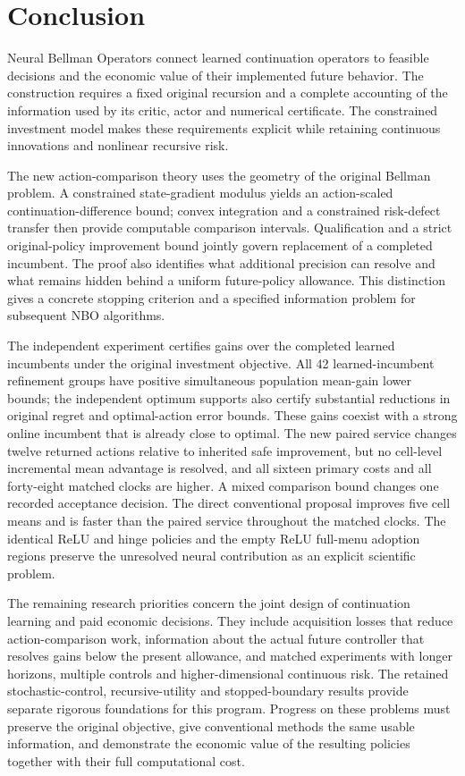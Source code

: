 \section{Conclusion}\label{sec:conclusion120}
Neural Bellman Operators connect learned continuation operators to feasible
decisions and the economic value of their implemented future behavior. The
construction requires a fixed original recursion and a complete accounting of
the information used by its critic, actor and numerical certificate. The
constrained investment model makes these requirements explicit while retaining
continuous innovations and nonlinear recursive risk.

The new action-comparison theory uses the geometry of the original Bellman
problem. A constrained state-gradient modulus yields an action-scaled
continuation-difference bound; convex integration and a constrained risk-defect
transfer then provide computable comparison intervals. Qualification and a
strict original-policy improvement bound jointly govern replacement of a
completed incumbent. The proof also identifies what additional precision can
resolve and what remains hidden behind a uniform future-policy allowance. This
distinction gives a concrete stopping criterion and a specified information
problem for subsequent NBO algorithms.

The independent experiment certifies gains over the completed learned
incumbents under the original investment objective. All 42 learned-incumbent
refinement groups have positive simultaneous population mean-gain lower bounds;
the independent optimum supports also certify substantial reductions in
original regret and optimal-action error bounds. These gains coexist with a
strong online incumbent that is already close to optimal. The new paired
service changes twelve returned actions relative to inherited safe improvement,
but no cell-level incremental mean advantage is resolved, and all sixteen
primary costs and all forty-eight matched clocks are higher. A mixed comparison
bound changes one recorded acceptance decision. The direct conventional proposal
improves five cell means and is faster than the paired service throughout the
matched clocks. The identical ReLU and hinge policies and the empty ReLU
full-menu adoption regions preserve the unresolved neural contribution as an
explicit scientific problem.

The remaining research priorities concern the joint design of continuation
learning and paid economic decisions. They include acquisition losses that
reduce action-comparison work, information about the actual future controller
that resolves gains below the present allowance, and matched experiments with
longer horizons, multiple controls and higher-dimensional continuous risk.
The retained stochastic-control, recursive-utility and stopped-boundary results
provide separate rigorous foundations for this program. Progress on these
problems must preserve the original objective, give conventional methods the
same usable information, and demonstrate the economic value of the resulting
policies together with their full computational cost.
